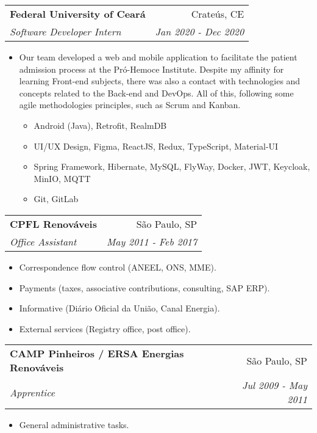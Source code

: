 \documentclass[letterpaper,11pt]{article}
\makeatletter
\newcommand{\divider}{\textcolor{body!30}{\hdashrule{\linewidth}{0.5pt}{0.7ex}}\medskip}
\newcommand{\resumeSubheading}[4]{
  \vspace{-1pt}\item
    \begin{tabular*}{0.97\textwidth}{l@{\extracolsep{\fill}}r}
      \textbf{#1} & #2 \\
      \textit{\small#3} & \textit{\small #4} \\
    \end{tabular*}\vspace{-5pt}
}
\makeatother
\begin{document}
    \resumeSubheading
      {Federal University of Ceará}{\faMapMarker \hspace{0.1cm} Crateús, CE}
      {Software Developer Intern}{\faCalendar \hspace{0.1cm} Jan 2020 - Dec 2020}
      \begin{itemize}
          \item Our team developed a web and mobile application to facilitate the patient admission process at the Pró-Hemoce Institute. Despite my affinity for learning Front-end subjects, there was also a contact with technologies and concepts related to the Back-end and DevOps. All of this, following some agile methodologies principles, such as Scrum and Kanban. \\
          \begin{itemize}
              \item Android (Java), Retrofit, RealmDB
              \item UI/UX Design, Figma, ReactJS, Redux, TypeScript, Material-UI
              \item Spring Framework, Hibernate, MySQL, FlyWay, Docker, JWT, Keycloak, MinIO, MQTT
              \item Git, GitLab
          \end{itemize}
      \end{itemize}
      
    \vspace{-0.2cm}
    \divider
      
    \resumeSubheading
      {CPFL Renováveis}{\faMapMarker \hspace{0.1cm} São Paulo, SP}
      {Office Assistant}{\faCalendar \hspace{0.1cm} May 2011 - Feb 2017}
        \begin{itemize}
            \item Correspondence flow control (ANEEL, ONS, MME).
            \item Payments (taxes, associative contributions, consulting, SAP ERP).
            \item Informative (Diário Oficial da União, Canal Energia).
            \item External services (Registry office, post office).
        \end{itemize}
      
    \vspace{-0.2cm}
    \divider
      
    \resumeSubheading
      {CAMP Pinheiros / ERSA Energias Renováveis}{\faMapMarker \hspace{0.1cm} São Paulo, SP}
      {Apprentice}{\faCalendar \hspace{0.1cm} Jul 2009 - May 2011}
        \begin{itemize}
            \item General administrative tasks.
        \end{itemize}
\end{document}
